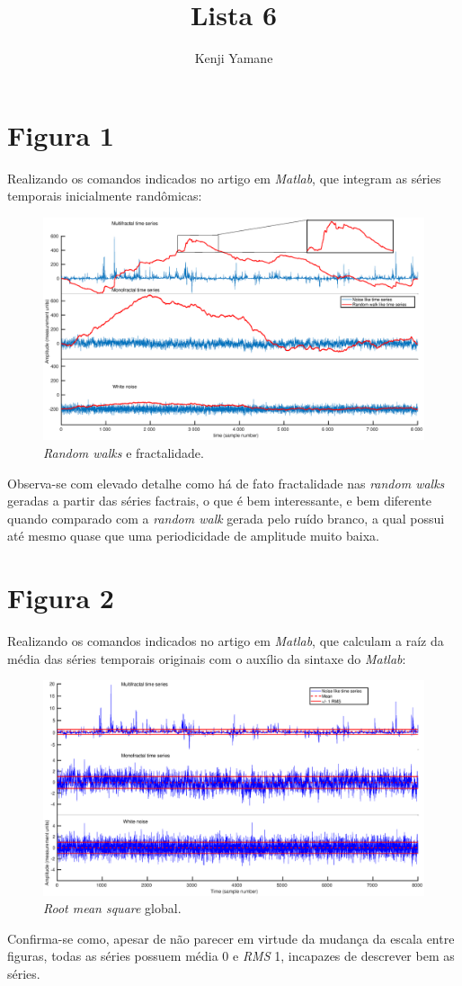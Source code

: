 \documentclass{article}[twocolumn]
\title{Lista 6}
\author{Kenji Yamane}
\begin{document}
	\maketitle
	\section{Figura 1}
	Realizando os comandos indicados no artigo em \textit{Matlab}, que integram as s\'eries
	temporais inicialmente rand\^omicas:
	\begin{figure}[H]
		\centering
		\includegraphics[width=12cm]{fig1.eps}
		\caption{\textit{Random walks} e fractalidade.}
	\end{figure}
	Observa-se com elevado detalhe como h\'a de fato fractalidade nas \textit{random walks} geradas
	a partir das s\'eries factrais, o que \'e bem interessante, e bem diferente quando comparado
	com a \textit{random walk} gerada pelo ru\'ido branco, a qual possui at\'e mesmo
	quase que uma periodicidade de amplitude muito baixa.
	\section{Figura 2}
	Realizando os comandos indicados no artigo em \textit{Matlab}, que calculam a ra\'iz da
	m\'edia das s\'eries temporais originais com o aux\'ilio da sintaxe do \textit{Matlab}:
	\begin{figure}[H]
		\centering
		\includegraphics[width=12cm]{fig2.eps}
		\caption{\textit{Root mean square} global.}
	\end{figure}
	Confirma-se como, apesar de n\~ao parecer em virtude da mudan\c{c}a da escala entre figuras,
	todas as s\'eries possuem m\'edia 0 e \textit{RMS} 1, incapazes de descrever bem as s\'eries.
\end{document}
